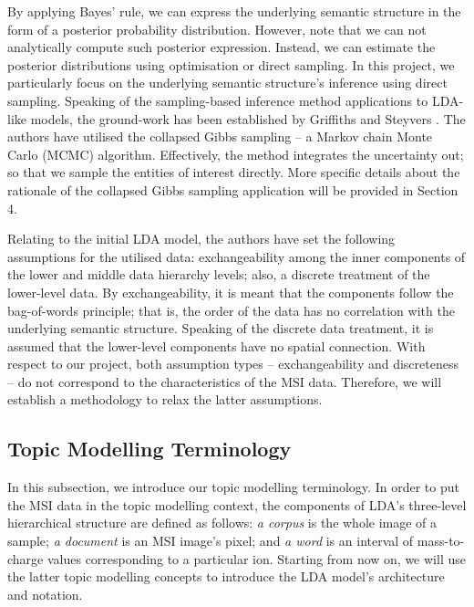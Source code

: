 \documentclass{mpaper}
\begin{document}
\par By applying Bayes' rule, we can express the underlying semantic structure in the form of a posterior probability distribution. However, note that we can not analytically compute such posterior expression. Instead, we can estimate the posterior distributions using optimisation or direct sampling. In this project, we particularly focus on the underlying semantic structure's inference using direct sampling. Speaking of the sampling-based inference method applications to LDA-like models, the ground-work has been established by Griffiths and Steyvers \cite{griffiths2004finding}. The authors have utilised the collapsed Gibbs sampling -- a Markov chain Monte Carlo (MCMC) algorithm. Effectively, the method integrates the uncertainty out; so that we sample the entities of interest directly. More specific details about the rationale of the collapsed Gibbs sampling application will be provided in Section 4. 

\par Relating to the initial LDA model, the authors have set the following assumptions for the utilised data: exchangeability among the inner components of the lower and middle data hierarchy levels; also, a discrete treatment of the lower-level data. By exchangeability, it is meant that the components follow the bag-of-words principle; that is, the order of the data has no correlation with the underlying semantic structure. Speaking of the discrete data treatment, it is assumed that the lower-level components have no spatial connection. With respect to our project, both assumption types -- exchangeability and discreteness -- do not correspond to the characteristics of the MSI data. Therefore, we will establish a methodology to relax the latter assumptions.

\subsection{Topic Modelling Terminology}

\par In this subsection, we introduce our topic modelling terminology. In order to put the MSI data in the topic modelling context, the components of  LDA's three-level hierarchical structure are defined as follows: \textit{a corpus} is the whole image of a sample; \textit{a document} is an MSI image's pixel; and \textit{a word} is an interval of mass-to-charge values corresponding to a particular ion. Starting from now on, we will use the latter topic modelling concepts to introduce the LDA model's architecture and notation.
\end{document}
